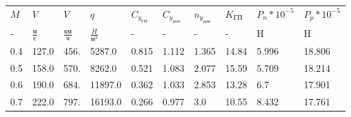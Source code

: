 \begin{tabular}{llllllllll}
$M$ & $V$ & $V$ & $q$ & $C_{y_{ГП}}$ & $C_{y_{доп}}$ & $n_{y_{доп}}$ & $K_{ГП}$ & $P_{n}*10^{-5}$ & $P_{p}*10^{-5}$ \\
- & $\frac{м}{с}$ & $\frac{км}{ч}$ & $\frac{H}{м^2}$ & - & - & - & - & H & H \\
0.4 & 127.0 & 456. & 5287.0 & 0.815 & 1.112 & 1.365 & 14.84 & 5.996 & 18.806 \\
0.5 & 158.0 & 570. & 8262.0 & 0.521 & 1.083 & 2.077 & 15.59 & 5.709 & 18.214 \\
0.6 & 190.0 & 684. & 11897.0 & 0.362 & 1.033 & 2.853 & 13.28 & 6.7 & 17.901 \\
0.7 & 222.0 & 797. & 16193.0 & 0.266 & 0.977 & 3.0 & 10.55 & 8.432 & 17.761 \\
\end{tabular}
